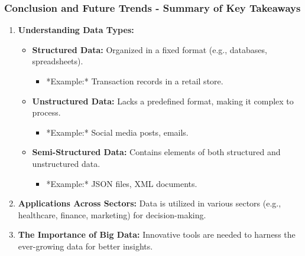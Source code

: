\documentclass{beamer}
\begin{document}
\begin{frame}[fragile]
    \frametitle{Conclusion and Future Trends - Summary of Key Takeaways}
    \begin{enumerate}
        \item \textbf{Understanding Data Types:}
            \begin{itemize}
                \item \textbf{Structured Data:} 
                Organized in a fixed format (e.g., databases, spreadsheets). 
                \begin{itemize}
                    \item *Example:* Transaction records in a retail store.
                \end{itemize}
                \item \textbf{Unstructured Data:}
                Lacks a predefined format, making it complex to process.
                \begin{itemize}
                    \item *Example:* Social media posts, emails.
                \end{itemize}
                \item \textbf{Semi-Structured Data:}
                Contains elements of both structured and unstructured data.
                \begin{itemize}
                    \item *Example:* JSON files, XML documents.
                \end{itemize}
            \end{itemize}
        
        \item \textbf{Applications Across Sectors:}
        Data is utilized in various sectors (e.g., healthcare, finance, marketing) for decision-making.
        
        \item \textbf{The Importance of Big Data:}
        Innovative tools are needed to harness the ever-growing data for better insights.
    \end{enumerate}
\end{frame}
\end{document}
